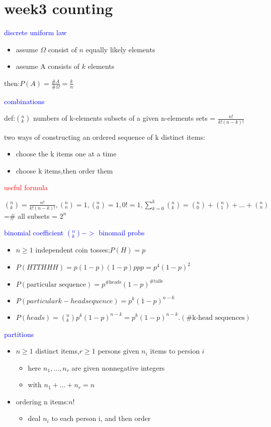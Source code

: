 \section*{week3 counting}


\textcolor{blue}{discrete uniform law}

\begin{itemize}
    \item assume $\Omega$ consist of $n$ equally likely elements
    \item assume A consists of $k$ elements 
\end{itemize}

then:$P(A)=\frac{\# A}{\# \Omega}=\frac{k}{n}$



\textcolor{blue}{combinations}

def:$(^n_k)$ numbers of k-elements subsets of a given n-elements sets = $\frac{n!}{k!(n-k)!}$

two ways of constructing an ordered sequence of k distinct items:

\begin{itemize}
    \item choose the k items one at a time
    \item choose k items,then order them
\end{itemize}

\textcolor{red}{useful formula}

$(^n_k)=\frac{n!}{k!(n-k)!},(^n_n)=1,(^n_0)=1,0!=1,\sum_{k=0}^k(^n_k)=(^n_0)+(^n_1)+...+(^n_n)$=\# all subsets = $2^n$

\textcolor{blue}{binomial coefficient $(^n_k)->$ binomail probs}

\begin{itemize}
    \item $n\geq 1$ independent coin tosses;$P(H)=p$
    \item $P(HTTHHH)=p(1-p)(1-p)ppp=p^4(1-p)^2$
    \item $P(\text{particular sequence})=p^{\text{\# heads}}(1-p)^{\text{\# tails}}$
    \item $P(particular k-head sequence)=p^k(1-p)^{n-k}$
    \item $P(heads)=(^n_k)p^k(1-p)^{n-k}=p^k(1-p)^{n-k}.(\text{\# k-head sequences})$
\end{itemize}

\textcolor{blue}{partitions}

\begin{itemize}
    \item $n\geq 1$ distinct items,$r\geq 1$ persons given $n_i$ items to persion $i$
    \begin{itemize}
        \item here $n_1,...,n_r$ are given nonnegative integers
        \item with $n_1+...+n_r=n$
    \end{itemize} 
    \item ordering n items:$n!$
    \begin{itemize}
        \item deal $n_i$ to each person i, and then order
    \end{itemize}
\end{itemize}

